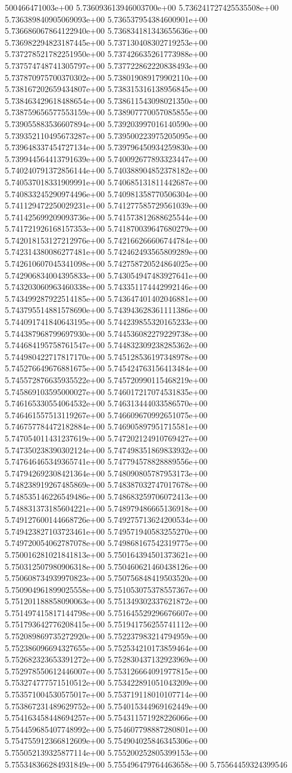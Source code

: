 500466471003e+00	5.736093613946003700e+00	5.736241727425535508e+00	5.736389840905069093e+00	5.736537954384600901e+00	5.736686067864122940e+00	5.736834181343655636e+00	5.736982294823187445e+00	5.737130408302719253e+00	5.737278521782251950e+00	5.737426635261773988e+00	5.737574748741305797e+00	5.737722862220838493e+00	5.737870975700370302e+00	5.738019089179902110e+00	5.738167202659434807e+00	5.738315316138956845e+00	5.738463429618488654e+00	5.738611543098021350e+00	5.738759656577553159e+00	5.738907770057085855e+00	5.739055883536607894e+00	5.739203997016140590e+00	5.739352110495673287e+00	5.739500223975205095e+00	5.739648337454727134e+00	5.739796450934259830e+00	5.739944564413791639e+00	5.740092677893323447e+00	5.740240791372856144e+00	5.740388904852378182e+00	5.740537018331909991e+00	5.740685131811442687e+00	5.740833245290974496e+00	5.740981358770506304e+00	5.741129472250029231e+00	5.741277585729561039e+00	5.741425699209093736e+00	5.741573812688625544e+00	5.741721926168157353e+00	5.741870039647680279e+00	5.742018153127212976e+00	5.742166266606744784e+00	5.742314380086277481e+00	5.742462493565809289e+00	5.742610607045341098e+00	5.742758720524864025e+00	5.742906834004395833e+00	5.743054947483927641e+00	5.743203060963460338e+00	5.743351174442992146e+00	5.743499287922514185e+00	5.743647401402046881e+00	5.743795514881578690e+00	5.743943628361111386e+00	5.744091741840643195e+00	5.744239855320165233e+00	5.744387968799697930e+00	5.744536082279229738e+00	5.744684195758761547e+00	5.744832309238285362e+00	5.744980422717817170e+00	5.745128536197348978e+00	5.745276649676881675e+00	5.745424763156413484e+00	5.745572876635935522e+00	5.745720990115468219e+00	5.745869103595000027e+00	5.746017217074531835e+00	5.746165330554064532e+00	5.746313444033586570e+00	5.746461557513119267e+00	5.746609670992651075e+00	5.746757784472182884e+00	5.746905897951715581e+00	5.747054011431237619e+00	5.747202124910769427e+00	5.747350238390302124e+00	5.747498351869833932e+00	5.747646465349365741e+00	5.747794578828889556e+00	5.747942692308421364e+00	5.748090805787953173e+00	5.748238919267485869e+00	5.748387032747017678e+00	5.748535146226549486e+00	5.748683259706072413e+00	5.748831373185604221e+00	5.748979486665136918e+00	5.749127600144668726e+00	5.749275713624200534e+00	5.749423827103723461e+00	5.749571940583255270e+00	5.749720054062787078e+00	5.749868167542319775e+00	5.750016281021841813e+00	5.750164394501373621e+00	5.750312507980906318e+00	5.750460621460438126e+00	5.750608734939970823e+00	5.750756848419503520e+00	5.750904961899025558e+00	5.751053075378557367e+00	5.751201188858090063e+00	5.751349302337621872e+00	5.751497415817144798e+00	5.751645529296676607e+00	5.751793642776208415e+00	5.751941756255741112e+00	5.752089869735272920e+00	5.752237983214794959e+00	5.752386096694327655e+00	5.752534210173859464e+00	5.752682323653391272e+00	5.752830437132923969e+00	5.752978550612446007e+00	5.753126664091977815e+00	5.753274777571510512e+00	5.753422891051043209e+00	5.753571004530575017e+00	5.753719118010107714e+00	5.753867231489629752e+00	5.754015344969162449e+00	5.754163458448694257e+00	5.754311571928226066e+00	5.754459685407748992e+00	5.754607798887280801e+00	5.754755912366812609e+00	5.754904025846345306e+00	5.755052139325877114e+00	5.755200252805399153e+00	5.755348366284931849e+00	5.755496479764463658e+00	5.75564459324399546
